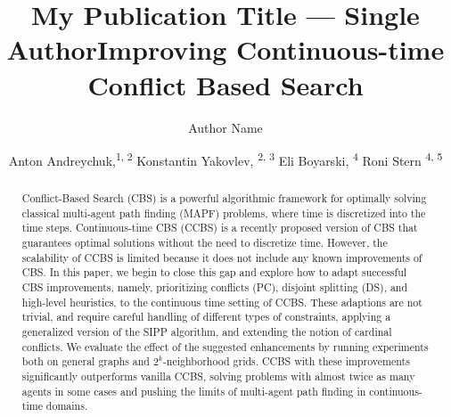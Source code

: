 \documentclass[letterpaper]{article} %
\title{My Publication Title --- Single Author}
\author {
    Author Name \\
}
\title{Improving Continuous-time Conflict Based Search}
\author {

        Anton Andreychuk,\textsuperscript{\rm 1, 2}
        Konstantin Yakovlev, \textsuperscript{\rm 2, 3}
        Eli Boyarski, \textsuperscript{\rm 4} 
        Roni Stern \textsuperscript{\rm 4, 5}\\
}
\newcommand\roni[1]{\nb{\textbf{Roni:}}{orange}{#1}}
\begin{document}
\maketitle


\begin{abstract}
Conflict-Based Search (CBS) is a powerful algorithmic framework for optimally solving classical multi-agent path finding (MAPF) problems, where time is discretized into the time steps. 
Continuous-time CBS (CCBS) is a recently proposed version of CBS that guarantees optimal solutions without the need to discretize time. 
However, the  scalability of CCBS is limited because it does not include any known improvements of CBS. 
In this paper, we begin to close this gap and explore how to adapt successful CBS improvements, namely, prioritizing conflicts (PC), disjoint splitting (DS), and high-level heuristics, to the continuous time setting of CCBS. 
These adaptions are not trivial, and require careful handling of different types of constraints, applying a generalized version of the \acf{SIPP} algorithm, and extending the notion of cardinal conflicts.  
We evaluate the effect of the suggested enhancements by running experiments both on general graphs and $2^k$-neighborhood grids. 
CCBS with these improvements significantly outperforms vanilla CCBS, 
solving problems with almost twice as many agents in some cases and 
pushing the limits of multi-agent path finding in continuous-time domains. 




\end{abstract}
\end{document}
